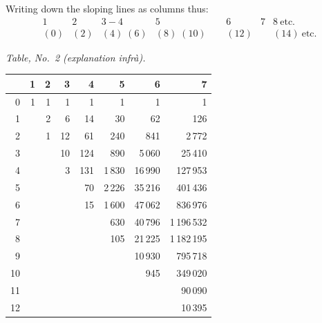 \documentclass[11pt]{article}
\begin{document}
\bigskip

Writing down the sloping lines as columns thus:
\[
   \begin{array}{cccccccc}
      1 & 2 & 3-4 & 5 & \;\, & 6 & 7 & 8\ \mathrm{etc.}\\
      (0) & (2) & (4)\;(6) & (8)\;(10) & & (12) & & (14)\ \mathrm{etc.}
   \end{array}
\]

\medskip

\begin{center}
\textit{Table, No.~2 (explanation infr\`a).}
\end{center}

\begin{center}
\begin{tabular}{r|rrrrrrr}
       & 1 & 2 & 3 & 4 & 5 & 6 & 7\\\hline
   0   & 1 & 1 & 1 & 1 & 1 & 1 & 1\\
   1   &   & 2 & 6 & 14 & 30 & 62 & 126\\
   2   &   & 1 & 12 & 61 & 240 & 841 & 2\,772\\
   3   &   &   & 10 & 124 & 890 & 5\,060 & 25\,410\\
   4   &   &   & 3 & 131 & 1\,830 & 16\,990 & 127\,953\\
   5   &   &   &   & 70 & 2\,226 & 35\,216 & 401\,436\\
   6   &   &   &   & 15 & 1\,600 & 47\,062 & 836\,976\\
   7   &   &   &   &   & 630 & 40\,796 & 1\,196\,532\\
   8   &   &   &   &   & 105 & 21\,225 & 1\,182\,195\\
   9   &   &   &   &   &     & 10\,930 & 795\,718\\
  10   &   &   &   &   &     & 945     & 349\,020\\
  11   &   &   &   &   &     &         & 90\,090\\
  12   &   &   &   &   &     &         & 10\,395
\end{tabular}
\end{center}

\medskip
\end{document}
